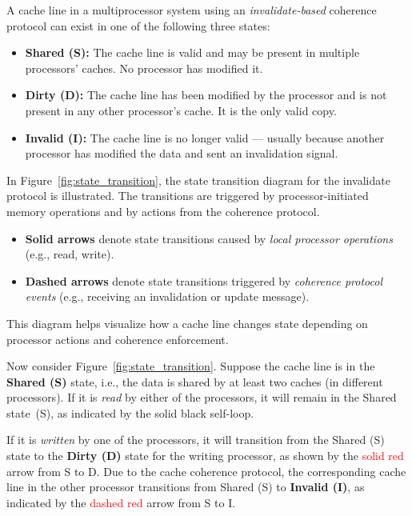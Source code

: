 \documentclass[12pt]{book}
\begin{document}
A cache line in a multiprocessor system using an \textit{invalidate-based} coherence protocol can exist in one of the following three states:

\begin{itemize}
    \item \textbf{Shared (S):} The cache line is valid and may be present in multiple processors’ caches. No processor has modified it.
    \item \textbf{Dirty (D):} The cache line has been modified by the processor and is not present in any other processor’s cache. It is the only valid copy.
    \item \textbf{Invalid (I):} The cache line is no longer valid — usually because another processor has modified the data and sent an invalidation signal.
\end{itemize}

In Figure~\ref{fig:state_transition}, the state transition diagram for the invalidate protocol is illustrated. The transitions are triggered by processor-initiated memory operations and by actions from the coherence protocol.

\begin{itemize}
    \item \textbf{Solid arrows} denote state transitions caused by \textit{local processor operations} (e.g., read, write).
    \item \textbf{Dashed arrows} denote state transitions triggered by \textit{coherence protocol events} (e.g., receiving an invalidation or update message).
\end{itemize}

This diagram helps visualize how a cache line changes state depending on processor actions and coherence enforcement.

Now consider Figure~\ref{fig:state_transition}. Suppose the cache line is in the \textbf{Shared (S)} state, i.e., the data is shared by at least two caches (in different processors).  
If it is \textit{read} by either of the processors, it will remain in the Shared state~(S), as indicated by the solid black self-loop.

If it is \textit{written} by one of the processors, it will transition from the Shared (S) state to the \textbf{Dirty (D)} state for the writing processor, as shown by the \textcolor{red}{solid red} arrow from S to D.  
Due to the cache coherence protocol, the corresponding cache line in the other processor transitions from Shared (S) to \textbf{Invalid (I)}, as indicated by the \textcolor{red}{dashed red} arrow from S to I.
\end{document}
